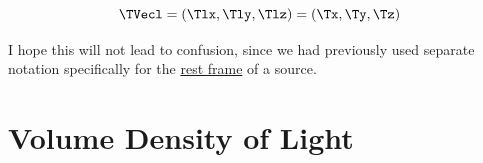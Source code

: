 \begin{equation}
	\label{eq: position of light}
	\TVecl  = (\Tlx ,\Tly ,\Tlz ) = (\Tx ,\Ty ,\Tz )
\end{equation}

I hope this will not lead to confusion, since we had previously used separate notation specifically for the \hyperlink{def-proper-frame}{rest frame} of a source.



\section{Volume Density of Light}\label{sect: Field Scalar Density}





